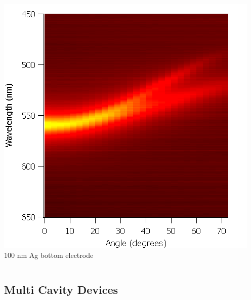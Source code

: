 \documentclass{beamer}
\begin{document}
\begin{frame}
\begin{columns}
\begin{column}{0.5\textwidth}
					\includegraphics[width=\textwidth]{images/n1_al_top_heatmap.png}
					100 nm Ag bottom electrode
				\end{column}
            \end{columns}
        \end{frame}
        
    \subsection{Multi Cavity Devices}
        
\end{document}
